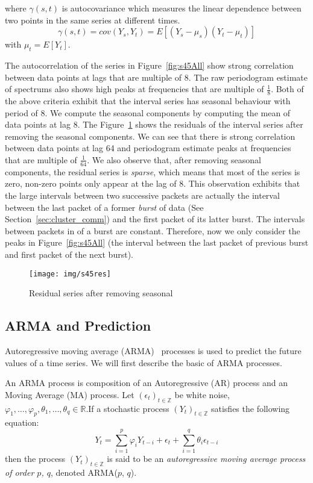 \documentclass[12pt]{article}
\begin{document}
where $\gamma(s,t)$ is autocovariance which measures the linear dependence
between two points in the same series at different times.
\begin{equation}
\gamma(s,t)=cov(Y_s, Y_t)=E[(Y_s-\mu_s)(Y_t-\mu_t)]
\end{equation}
with $\mu_t=E[Y_t]$.

The autocorrelation of the series in Figure~\ref{fig:s45All} show strong
correlation between data points at lags that are multiple of 8. The raw
periodogram estimate of spectrums also shows high peaks at frequencies that are
multiple of $\frac{1}{8}$. Both of the above criteria exhibit that the interval
series has seasonal behaviour with period of 8. We compute the seasonal
components by computing the mean of data points at lag 8. The
Figure~\ref{fig:s45res} shows the residuals of the interval series after
removing the seasonal components. We can see that there is strong correlation
between data points at lag 64 and periodogram estimate peaks at frequencies
that are multiple of $\frac{1}{64}$. We also observe that, after removing
seasonal components, the residual series is \textit{sparse}, which means that
most of the series is zero, non-zero points only appear at the lag of 8. This
observation exhibits that the large intervals between two successive packets are
actually the interval between the last packet of a former \textit{burst} of data
(See Section~\ref{sec:cluster_comm}) and the first packet of its latter burst.
The intervals between packets in of a burst are constant. Therefore, now we only
consider the peaks in Figure~\ref{fig:s45All} (the interval between the last packet of
previous burst and first packet of the next burst).

\begin{figure}[ht!]
\centering
\texttt{[image: img/s45res]}
\caption{Residual series after removing seasonal}\label{fig:s45res}
\end{figure}



\subsection{ARMA and Prediction}
Autoregressive moving average (ARMA)~\cite{BoxTimeSeries, FalkStatSAS}
 processes is used to predict the future values of a time series. We will first
 describe the basic of ARMA processes.
 
 An ARMA process is composition of an Autoregressive (AR) process and an Moving
 Average (MA) process. Let $(\epsilon_t)_{t\in \mathbb{Z}}$ be white noise,
 $\varphi_1, \ldots, \varphi_p, \theta_1, \ldots, \theta_q\in\mathbb{R}$.If a
stochastic process $(Y_t)_{t\in \mathbb{Z}}$ satisfies the following
 equation:
 \begin{equation}\label{eqn:ARMA}
 Y_t=\sum_{i=1}^{p}\varphi_iY_{t-i}+
 \epsilon_t +\sum_{i=1}^{q}\theta_i\epsilon_{t-i}
 \end{equation}
then the process $(Y_t)_{t\in \mathbb{Z}}$ is said to be
an \textit{autoregressive moving average process of order $p$, $q$}, denoted
ARMA($p$, $q$).
\end{document}
